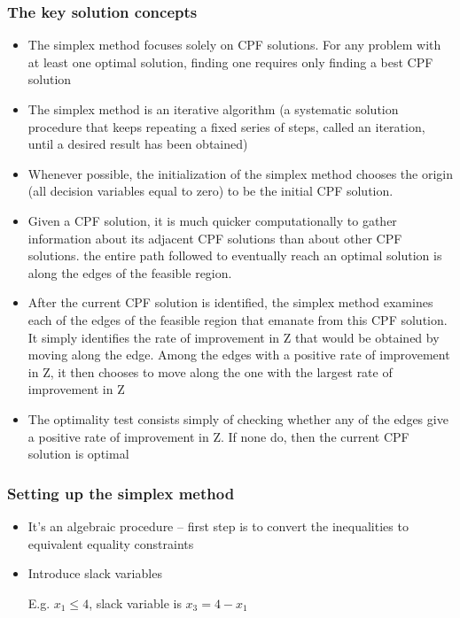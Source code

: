 \documentclass[12pt]{article}
\begin{document}
\subsubsection*{The key solution concepts}
\begin{itemize}
\item The simplex method focuses solely on CPF solutions. For
any problem with at least one optimal solution, finding one requires only finding a best CPF solution
\item The simplex method is an iterative algorithm (a systematic
solution procedure that keeps repeating a fixed series of steps, called an iteration,
until a desired result has been obtained) 
\item Whenever possible, the initialization of the simplex method
chooses the origin (all decision variables equal to zero) to be the initial CPF solution. 
\item Given a CPF solution, it is much quicker computationally
to gather information about its adjacent CPF solutions than about other CPF solutions. 
the entire path followed to eventually reach an optimal solution is along
the edges of the feasible region.
\end{itemize}



\begin{itemize}
\item After the current CPF solution is identified, the simplex
method examines each of the edges of the feasible region that emanate from this
CPF solution. 
It simply identifies the rate of improvement in Z that would
be obtained by moving along the edge. Among the edges with a positive rate of
improvement in Z, it then chooses to move along the one with the largest rate of
improvement in Z
\item The optimality test consists simply of checking whether
any of the edges give a positive rate of improvement in Z. If none do, then the
current CPF solution is optimal
\end{itemize}




\subsubsection*{Setting up the simplex method}
\begin{itemize}
\item It's an algebraic procedure -- first step is to convert the inequalities to equivalent equality constraints
\item Introduce slack variables

E.g. $x_1 \le 4$, slack variable is $x_3 = 4 - x_1 $
\end{itemize}
\end{document}
